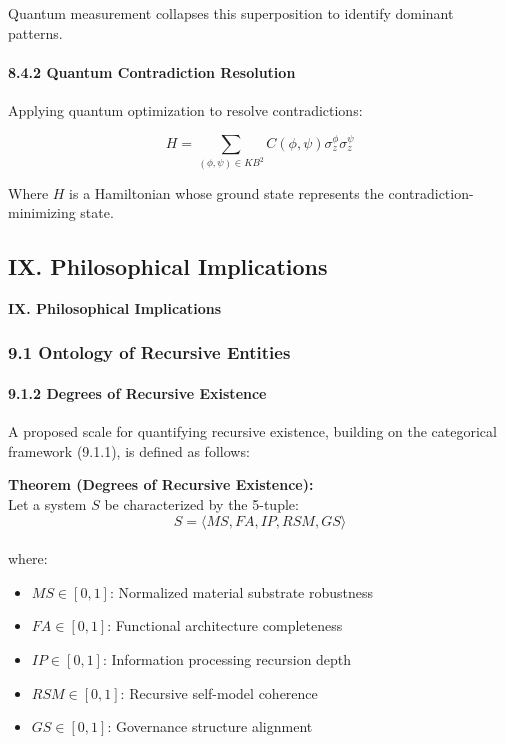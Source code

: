 \documentclass[
]{article}
\providecommand{\tightlist}{%
  \setlength{\itemsep}{0pt}\setlength{\parskip}{0pt}}
\begin{document}
Quantum measurement collapses this superposition to identify dominant
patterns.

\paragraph{8.4.2 Quantum Contradiction
Resolution}\label{quantum-contradiction-resolution}

Applying quantum optimization to resolve contradictions:

\[H = \sum_{(\phi, \psi) \in KB^2} C(\phi, \psi) \sigma_z^{\phi} \sigma_z^{\psi}\]

Where \(H\) is a Hamiltonian whose ground state represents the
contradiction-minimizing state.

\subsection{IX. Philosophical
Implications}\label{ix.-philosophical-implications}

\textbf{IX. Philosophical Implications}

\subsubsection{9.1 Ontology of Recursive
Entities}\label{ontology-of-recursive-entities}

\paragraph{9.1.2 Degrees of Recursive
Existence}\label{degrees-of-recursive-existence}

A proposed scale for quantifying recursive existence, building on the
categorical framework (9.1.1), is defined as follows:

\textbf{Theorem (Degrees of Recursive Existence):}\\
Let a system \(S\) be characterized by the 5-tuple:\\
\[
S = \langle MS, FA, IP, RSM, GS \rangle
\]\\
where:

\begin{itemize}
\tightlist
\item
  \(MS \in [0, 1]\): Normalized material substrate robustness\\
\item
  \(FA \in [0, 1]\): Functional architecture completeness\\
\item
  \(IP \in [0, 1]\): Information processing recursion depth\\
\item
  \(RSM \in [0, 1]\): Recursive self-model coherence\\
\item
  \(GS \in [0, 1]\): Governance structure alignment
\end{itemize}
\end{document}
